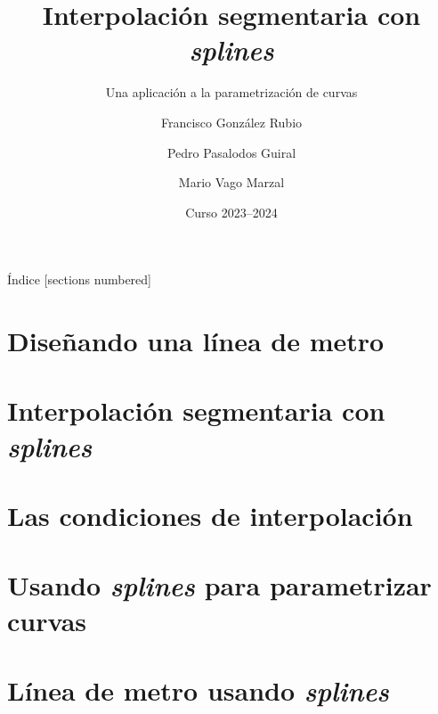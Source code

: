 \documentclass[10pt]{beamer}
\title{Interpolación segmentaria con \textit{splines}}
\subtitle{Una aplicación a la parametrización de curvas}
\author{Francisco González Rubio \and Pedro Pasalodos Guiral%
  \and Mario Vago Marzal}
\date{Curso 2023--2024}
\institute{Universitat de València}
\begin{document}
  {
    \vfuzz=16pt
    \maketitle
  }

  \begin{frame}{Índice}
    [sections numbered]
    \tableofcontents
  \end{frame}

  \section{Diseñando una línea de metro}
    

  \section{Interpolación segmentaria con \textit{splines}}
    

  \section{Las condiciones de interpolación}
    
    
    
    
    
    

  \section{Usando \textit{splines} para parametrizar curvas}
    
    

  \section{Línea de metro usando \textit{splines}}
    
\end{document}
